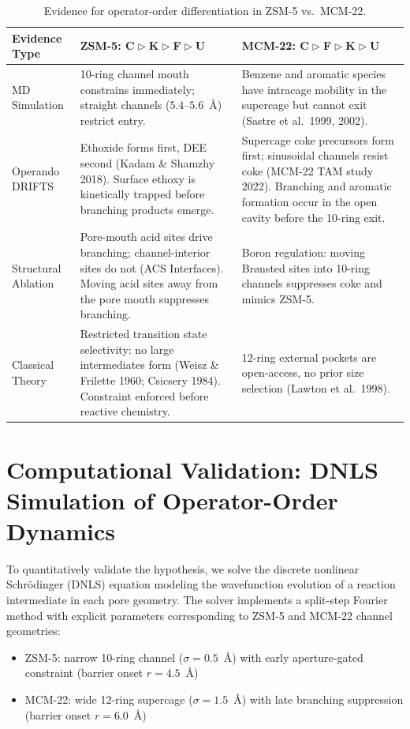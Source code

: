 \documentclass[11pt]{article}
\newcommand{\comp}{\mathrel{\triangleright}} %
\begin{document}
\begin{table}[h]
\centering
\small
\caption{Evidence for operator-order differentiation in ZSM-5 vs.\ MCM-22.}
\label{tab:evidence}
\begin{tabular}{|p{2.1cm}|p{5.7cm}|p{5.7cm}|}
\hline
\textbf{Evidence Type} & \textbf{ZSM-5: C$\comp$K$\comp$F$\comp$U} & \textbf{MCM-22: C$\comp$F$\comp$K$\comp$U} \\
\hline
MD Simulation & 10-ring channel mouth constrains immediately; straight channels ($5.4$--$5.6$~\AA) restrict entry. & Benzene and aromatic species have intracage mobility in the supercage but cannot exit (Sastre et al.\ 1999, 2002). \\
\hline
Operando DRIFTS & Ethoxide forms first, DEE second (Kadam \& Shamzhy 2018). Surface ethoxy is kinetically trapped before branching products emerge. & Supercage coke precursors form first; sinusoidal channels resist coke (MCM-22 TAM study 2022). Branching and aromatic formation occur in the open cavity before the 10-ring exit. \\
\hline
Structural Ablation & Pore-mouth acid sites drive branching; channel-interior sites do not (ACS Interfaces). Moving acid sites away from the pore mouth suppresses branching. & Boron regulation: moving Br\o nsted sites into 10-ring channels suppresses coke and mimics ZSM-5. \\
\hline
Classical Theory & Restricted transition state selectivity: no large intermediates form (Weisz \& Frilette 1960; Csicsery 1984). Constraint enforced before reactive chemistry. & 12-ring external pockets are open-access, no prior size selection (Lawton et al.\ 1998). \\
\hline
\end{tabular}
\end{table}

\section{Computational Validation: DNLS Simulation of Operator-Order Dynamics}

To quantitatively validate the hypothesis, we solve the discrete nonlinear Schr\"odinger (DNLS) equation modeling the wavefunction evolution of a reaction intermediate in each pore geometry. The solver implements a split-step Fourier method with explicit parameters corresponding to ZSM-5 and MCM-22 channel geometries:

\begin{itemize}[itemsep=1pt]
\item ZSM-5: narrow 10-ring channel ($\sigma = 0.5$~\AA) with early aperture-gated constraint (barrier onset $r=4.5$~\AA)
\item MCM-22: wide 12-ring supercage ($\sigma = 1.5$~\AA) with late branching suppression (barrier onset $r=6.0$~\AA)
\end{itemize}
\end{document}
